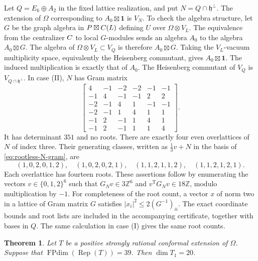 \documentclass[leqno]{article}
\let\cal\relax
\newcommand{\cal}{\mathcal}
\newcommand{\Z}{\ensuremath{\mathbb{Z}}}
\renewcommand{\leq}{\ensuremath{\leqslant}}
\newcommand{\ot}{\otimes}
\DeclareMathOperator{\Rep}{Rep}
\newtheorem{thm}{Theorem}[section]
\numberwithin{equation}{section}
\begin{document}
Let $Q = E_6\oplus A_2$ in the fixed lattice realization, and put $N = Q\cap\mathfrak h^\perp$. The extension of $\Omega$ corresponding to $A_0\boxtimes\mathbf 1$ is $V_N$. To check the algebra structure, let $G$ be the graph algebra in $\cal P\boxtimes\cal C(L)$ defining $U$ over $\Omega\ot V_L$. The equivalence from the centralizer $\cal C$ to local $G$-modules sends an algebra $A_0$ to the algebra $A_0\boxtimes G$. The algebra of $\Omega\ot V_L \subset V_Q$ is therefore $A_0\boxtimes G$. Taking the $V_L$-vacuum multiplicity space, equivalently the Heisenberg commutant, gives $A_0\boxtimes\mathbf1$. The induced multiplication is exactly that of $A_0$. The Heisenberg commutant of $V_Q$ is $V_{Q\cap\mathfrak h^\perp}$. In case (II), $N$ has Gram matrix
\begin{equation}
\label{eq:rootless-N-gram}
\begin{bmatrix}
4&-1&-2&-2&-1&-1\\
-1&4&-1&-1&2&2\\
-2&-1&4&1&-1&-1\\
-2&-1&1&4&1&1\\
-1&2&-1&1&4&1\\
-1&2&-1&1&1&4
\end{bmatrix}.
\end{equation}
It has determinant $351$ and no roots. There are exactly four even overlattices of $N$ of index three. Their generating classes, written as $\frac13 v+N$ in the basis of \eqref{eq:rootless-N-gram}, are
\begin{equation}
\label{eq:rootless-N-isotropic-lines}
(1,0,2,0,1,2),\quad(1,0,2,0,2,1),\quad
(1,1,2,1,1,2),\quad(1,1,2,1,2,1).
\end{equation}
Each overlattice has fourteen roots. These assertions follow by enumerating the vectors $v \in \{0,1,2\}^6$ such that $G_Nv \in 3\Z^6$ and $v^{\mathrm T}G_Nv \in 18\Z$, modulo multiplication by $-1$. For completeness of the root count, a vector $x$ of norm two in a lattice of Gram matrix $G$ satisfies $|x_i|^2\leq 2(G^{-1})_{ii}$. The exact coordinate bounds and root lists are included in the accompanying certificate, together with bases in $Q$. The same calculation in case (I) gives the same root counts.

\begin{thm}
\label{thm:dimension39-extension-currents}
Let $T$ be a positive strongly rational conformal extension of $\Omega$. Suppose that $\operatorname{FPdim}(\Rep(T)) = 39$. Then $\dim T_1 = 20$.
\end{thm}
\end{document}
